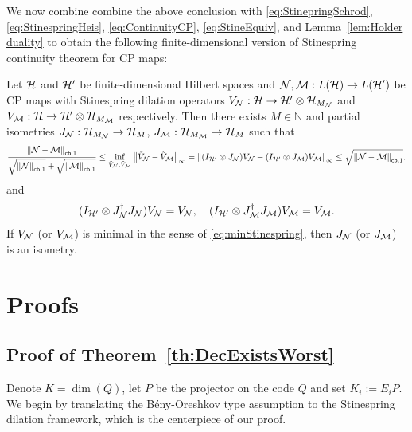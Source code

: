 \documentclass[10pt]{article}
\newcommand{\N}{\mathbb{N}}
\newcommand{\norm}[1]{\left\|#1\right\|}
\newcommand{\s}[1]{\mathsf{#1}}
\begin{document}
 We now combine combine the above conclusion with \eqref{eq:StinepringSchrod}, \eqref{eq:StinespringHeis}, \eqref{eq:ContinuityCP}, \eqref{eq:StineEquiv}, and Lemma~\ref{lem:Holder duality} to obtain the following finite-dimensional version of Stinespring continuity theorem for CP maps: 
 \begin{lemma}\label{lem:StinespringCont}
     Let ${\cal H}$ and ${\cal H}'$ be finite-dimensional Hilbert spaces and ${\cal N},{\cal M}:L({\cal H})\to L({\cal H}')$ be CP maps with Stinespring dilation operators $V_{{\cal N}}:{\cal H}\to {\cal H}' \otimes {\cal H}_{M_{{\cal N}}}$ and $V_{{\cal M}}:{\cal H}\to {\cal H}' \otimes {\cal H}_{M_{{\cal M}}}$ respectively. Then there exists $M\in \N$ and partial isometries $J_{{\cal N}}:{\cal H}_{M_{{\cal N}}}\to {\cal H}_M$, $J_{{\cal M}}:{\cal H}_{M_{{\cal M}}}\to {\cal H}_M$ such that 
      \begin{equation*}
     \frac{\norm{\calN  -\calM }_{\s{cb},1}}{\sqrt{\norm{\calN }_{\s{cb},1}}+\sqrt{\norm{\calM }_{\s{cb},1 }}} \leq \inf_{\Tilde{V}_{\calN},\Tilde{V}_{\calM}}\norm{\Tilde{V}_{\calN}-\Tilde{V}_{\calM}}_\infty=\norm{(I_{\calH'}\otimes J_{\calN})V_{\calN}-(I_{\calH'}\otimes J_{\calM}){V}_{\calM}}_\infty\leq \sqrt{\norm{\calN  -\calM }_{\s{cb}, 1}}.
 \end{equation*}
 and 
 \begin{align*}
      (I_{{\cal H}'}\otimes J_{{\cal N}}^\dag J_{{\cal N}})V_{{\cal N}}=V_{{\cal N}}, \quad (I_{{\cal H}'}\otimes J_{{\cal M}}^\dag J_{{\cal M}})V_{{\cal M}}=V_{{\cal M}}.
 \end{align*}
 If $V_{{\cal N}}$ (or $V_{{\cal M}}$) is minimal in the sense of \eqref{eq:minStinespring}, then $J_{{\cal N}}$ (or $J_{{\cal M}}$) is an isometry.
 \end{lemma}

\section{Proofs}
\subsection{Proof of Theorem~\ref{th:DecExistsWorst}}\label{app:PoorfBOdecoder}

Denote $K=\dim(Q)$, let $P$ be the projector on the code $Q$ and set $K_i:=E_i P$. We begin by translating the B\'eny-Oreshkov type assumption to the Stinespring dilation framework, which is the centerpiece of our proof.\vspace{0.2cm}
\end{document}
